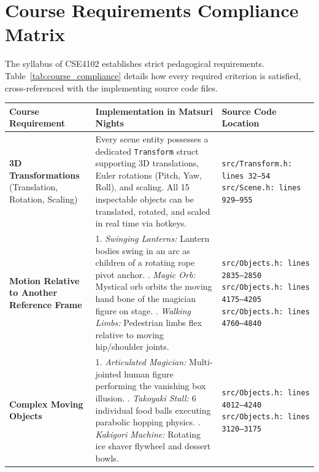 \section{Course Requirements Compliance Matrix}
The syllabus of CSE4102 establishes strict pedagogical requirements. Table~\ref{tab:course_compliance} details how every required criterion is satisfied, cross-referenced with the implementing source code files.

\begin{table}[htbp]
\centering
\footnotesize
\renewcommand{\arraystretch}{0.92}
\begin{tabularx}{\textwidth}{p{4.0cm} p{7.0cm} p{4.2cm}}
\toprule
\textbf{Course Requirement} & \textbf{Implementation in Matsuri Nights} & \textbf{Source Code Location} \\
\midrule
\textbf{3D Transformations} \newline (Translation, Rotation, Scaling) &
Every scene entity possesses a dedicated \texttt{Transform} struct supporting 3D translations, Euler rotations (Pitch, Yaw, Roll), and scaling. All 15 inspectable objects can be translated, rotated, and scaled in real time via hotkeys. &
\texttt{src/Transform.h: lines 32--54} \newline
\texttt{src/Scene.h: lines 929--955} \\
\addlinespace
\textbf{Motion Relative to Another Reference Frame} &
1. \textit{Swinging Lanterns:} Lantern bodies swing in an arc as children of a rotating rope pivot anchor. \newline
2. \textit{Magic Orb:} Mystical orb orbits the moving hand bone of the magician figure on stage. \newline
3. \textit{Walking Limbs:} Pedestrian limbs flex relative to moving hip/shoulder joints. &
\texttt{src/Objects.h: lines 2835--2850} \newline
\texttt{src/Objects.h: lines 4175--4205} \newline
\texttt{src/Objects.h: lines 4760--4840} \\
\addlinespace
\textbf{Complex Moving Objects} &
1. \textit{Articulated Magician:} Multi-jointed human figure performing the vanishing box illusion. \newline
2. \textit{Takoyaki Stall:} 6 individual food balls executing parabolic hopping physics. \newline
3. \textit{Kakigori Machine:} Rotating ice shaver flywheel and dessert bowls. &
\texttt{src/Objects.h: lines 4012--4240} \newline
\texttt{src/Objects.h: lines 3120--3175} \newline

\end{tabularx}
\end{table}
